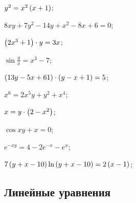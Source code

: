 \begin{enumsols}
		\label{sol:firstorder:homogeneous_cauchy}
		\item \( y^2 = x^2 \left( x + 1 \right) \); \sfill %
		\item \( 8xy + 7y^2 - 14y + x^2 - 8x + 6 = 0 \); \sfill %
		\item \( \left( 2x^3 + 1 \right) \cdot y = 3x \); \sfill %
		\item \( \sin{\frac{y}{x}} = x^3 - 7 \); \sfill %
		\item \( \left( 13y - 5x + 61 \right) \cdot \left( y - x + 1 \right) = 5 \); \sfill %
		\item \( x^6 = 2x^5 y + y^2 + x^4 \); \sfill %
		\item \( x = y \cdot \left( 2 - x^2 \right) \); \sfill %
		\item \( \cos{xy} + x = 0 \); \sfill %
		\item \( e^{-xy} = 4 - 2e^{-x} - e^{x} \); \sfill %
		\item \( 7 \left( y + x - 10 \right)\ln\left( y + x - 10 \right) = 2 \left( x - 1 \right) \); \sfill %

	\end{enumsols}

\subsection*{Линейные уравнения}

